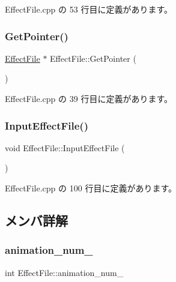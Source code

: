  Effect\+File.\+cpp の 53 行目に定義があります。

\mbox{\label{class_effect_file_a0f61b1e53e67b28cb46f93b6ba20f941}} 
\subsubsection{\texorpdfstring{Get\+Pointer()}{GetPointer()}}
{\footnotesize\ttfamily \mbox{\hyperlink{class_effect_file}{Effect\+File}} $\ast$ Effect\+File\+::\+Get\+Pointer (\begin{DoxyParamCaption}{ }\end{DoxyParamCaption})\hspace{0.3cm}{\ttfamily [static]}}



 Effect\+File.\+cpp の 39 行目に定義があります。

\mbox{\label{class_effect_file_a8106530f6c71c81e7e2843cec9fe1094}} 
\subsubsection{\texorpdfstring{Input\+Effect\+File()}{InputEffectFile()}}
{\footnotesize\ttfamily void Effect\+File\+::\+Input\+Effect\+File (\begin{DoxyParamCaption}{ }\end{DoxyParamCaption})}



 Effect\+File.\+cpp の 100 行目に定義があります。



\subsection{メンバ詳解}
\mbox{\label{class_effect_file_a991ad3cf78c2fcd2301f7f5e0d30b021}} 
\subsubsection{\texorpdfstring{animation\+\_\+num\+\_\+}{animation\_num\_}}
{\footnotesize\ttfamily int Effect\+File\+::animation\+\_\+num\+\_\+}



